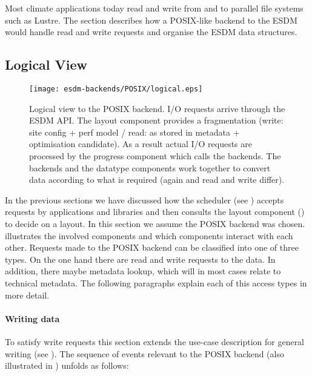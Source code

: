 
Most climate applications today read and write from and to parallel file systems such as Lustre.
The section describes how a POSIX-like backend to the ESDM would handle read and write requests and organise the ESDM data structures.


\subsection{Logical View}
\label{backend: posix/logical}

\begin{figure}
	\centering
	\texttt{[image: esdm-backends/POSIX/logical.eps]}
	\caption{Logical view to the POSIX backend. I/O requests arrive through the ESDM API. The layout component provides a fragmentation (write: site config + perf model / read: as stored in metadata + optimisation candidate). As a result actual I/O requests are processed by the progress component which calls the backends. The backends and the datatype components work together to convert data according to what is required (again and read and write differ).}
	\label{fig:backend posix logical view}
\end{figure}

In the previous sections we have discussed how the scheduler (see ) accepts requests by applications and libraries and then consults the layout component () to decide on a layout.
In this section we assume the POSIX backend was chosen.
 illustrates the involved components and which components interact with each other.
Requests made to the POSIX backend can be classified into one of three types.
On the one hand there are read and write requests to the data.
In addition, there maybe metadata lookup, which will in most cases relate to technical metadata.
The following paragraphs explain each of this access types in more detail.


\paragraph{Writing data}
To satisfy write requests this section extends the use-case description for general writing (see ).
The sequence of events relevant to the POSIX backend (also illustrated in ) unfolds as follows:

